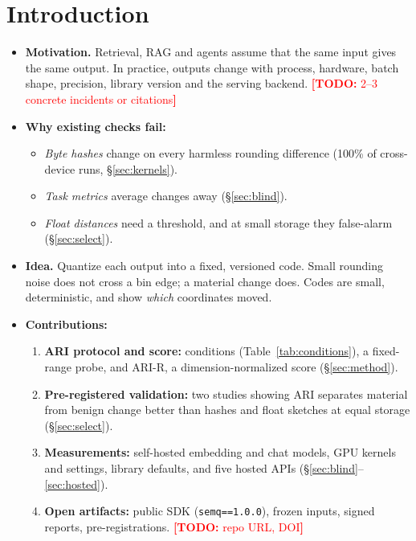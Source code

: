 \documentclass{article}
\newcommand{\todo}[1]{\textcolor{red}{\textbf{[TODO:} #1\textbf{]}}}
\begin{document}
\section{Introduction}\label{sec:intro}
\begin{itemize}
  \item \textbf{Motivation.} Retrieval, RAG and agents assume that the same input gives the same output. In practice, outputs change with process, hardware, batch shape, precision, library version and the serving backend. \todo{2--3 concrete incidents or citations}
  \item \textbf{Why existing checks fail:}
  \begin{itemize}
    \item \emph{Byte hashes} change on every harmless rounding difference (100\% of cross-device runs, \S\ref{sec:kernels}).
    \item \emph{Task metrics} average changes away (\S\ref{sec:blind}).
    \item \emph{Float distances} need a threshold, and at small storage they false-alarm (\S\ref{sec:select}).
  \end{itemize}
  \item \textbf{Idea.} Quantize each output into a fixed, versioned code. Small rounding noise does not cross a bin edge; a material change does. Codes are small, deterministic, and show \emph{which} coordinates moved.
  \item \textbf{Contributions:}
  \begin{enumerate}
    \item \textbf{ARI protocol and score:} conditions (Table~\ref{tab:conditions}), a fixed-range probe, and ARI-R, a dimension-normalized score (\S\ref{sec:method}).
    \item \textbf{Pre-registered validation:} two studies showing ARI separates material from benign change better than hashes and float sketches at equal storage (\S\ref{sec:select}).
    \item \textbf{Measurements:} self-hosted embedding and chat models, GPU kernels and settings, library defaults, and five hosted APIs (\S\ref{sec:blind}--\ref{sec:hosted}).
    \item \textbf{Open artifacts:} public SDK (\texttt{semq==1.0.0}), frozen inputs, signed reports, pre-registrations. \todo{repo URL, DOI}
  \end{enumerate}
\end{itemize}

\end{document}
